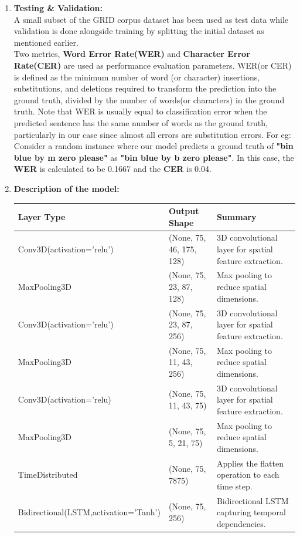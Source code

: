 \begin{enumerate}
\item \textbf{\large Testing \& Validation:}\\
A small subset of the GRID corpus dataset has been used as test data while validation is done alongside training by splitting the initial dataset as mentioned earlier.\\
Two metrics, \textbf{Word Error Rate(WER)} and \textbf{Character Error Rate(CER)} are used as performance evaluation parameters. WER(or CER) is defined as the minimum number of word (or character) insertions, substitutions, and deletions required to transform the prediction into the ground truth, divided by the number of words(or characters) in the ground truth. Note that WER is usually equal to classification error when the predicted sentence has the same number of words as the ground truth, particularly in our case since almost all errors are substitution errors.
For eg: Consider a random instance where our model predicts a ground truth of \textbf{"bin blue by m zero please"} as \textbf{"bin blue by b zero please"}.
In this case, the \textbf{WER} is calculated to be 0.1667 and the \textbf{CER} is 0.04.
\newpage
\item \textbf{\large Description of the model:}
\begin{table}[H]
\begin{tabularx}{\textwidth}{|l|X|X|}
    \hline
    \textbf{Layer Type} & \textbf{Output Shape} & \textbf{Summary} \\
    \hline
    Conv3D(activation='relu') & (None, 75, 46, 175, 128) & 3D convolutional layer for spatial feature extraction. \\
    \hline
    MaxPooling3D & (None, 75, 23, 87, 128) & Max pooling to reduce spatial dimensions. \\
    \hline
    Conv3D(activation='relu') & (None, 75, 23, 87, 256) & 3D convolutional layer for spatial feature extraction. \\
    \hline
    MaxPooling3D & (None, 75, 11, 43, 256) & Max pooling to reduce spatial dimensions. \\
    \hline
    Conv3D(activation='relu) & (None, 75, 11, 43, 75) & 3D convolutional layer for spatial feature extraction. \\
    \hline
    MaxPooling3D & (None, 75, 5, 21, 75) & Max pooling to reduce spatial dimensions. \\
    \hline
    TimeDistributed & (None, 75, 7875) & Applies the flatten operation to each time step. \\
    \hline
    Bidirectional(LSTM,activation='Tanh') & (None, 75, 256) & Bidirectional LSTM capturing temporal dependencies. \\

\end{tabularx}
\end{table}
\end{enumerate}
